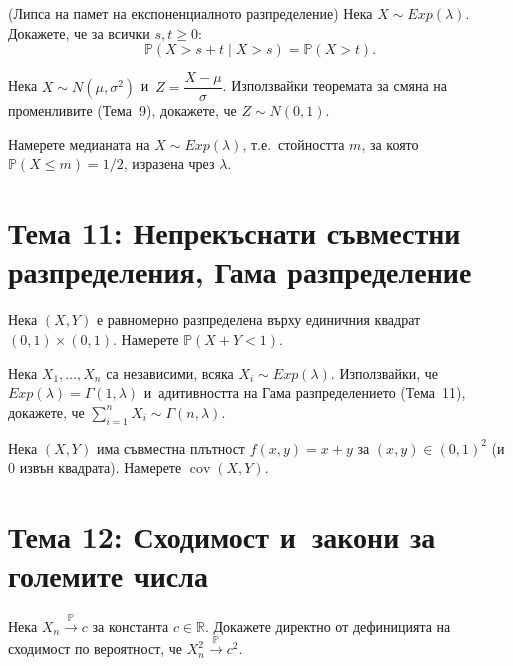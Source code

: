 \begin{probbox}[Задача 10.1]
(Липса на памет на експоненциалното разпределение) Нека $X\sim
Exp(\lambda)$. Докажете, че за всички $s,t\ge0$:
\[
  \mathbb P(X>s+t\mid X>s) = \mathbb P(X>t).
\]
\end{probbox}

\begin{probbox}[Задача 10.2]
Нека $X\sim N(\mu,\sigma^2)$ и~$Z=\dfrac{X-\mu}\sigma$. Използвайки
теоремата за смяна на променливите (Тема~9), докажете, че $Z\sim
N(0,1)$.
\end{probbox}

\begin{probbox}[Задача 10.3]
Намерете медианата на $X\sim Exp(\lambda)$, т.е.\ стойността $m$,
за която $\mathbb P(X\le m)=1/2$, изразена чрез $\lambda$.
\end{probbox}

\section*{Тема 11: Непрекъснати съвместни разпределения, Гама разпределение}

\begin{probbox}[Задача 11.1]
Нека $(X,Y)$ е равномерно разпределена върху единичния квадрат
$(0,1)\times(0,1)$. Намерете $\mathbb P(X+Y<1)$.
\end{probbox}

\begin{probbox}[Задача 11.2]
Нека $X_1,\dots,X_n$ са независими, всяка $X_i\sim Exp(\lambda)$.
Използвайки, че $Exp(\lambda)=\Gamma(1,\lambda)$ и~адитивността на
Гама разпределението (Тема~11), докажете, че $\sum_{i=1}^n X_i \sim
\Gamma(n,\lambda)$.
\end{probbox}

\begin{probbox}[Задача 11.3]
Нека $(X,Y)$ има съвместна плътност $f(x,y)=x+y$ за $(x,y)\in(0,1)^2$
(и~$0$ извън квадрата). Намерете $\operatorname{cov}(X,Y)$.
\end{probbox}

\section*{Тема 12: Сходимост и~закони за големите числа}

\begin{probbox}[Задача 12.1]
Нека $X_n\xrightarrow{\mathbb P}c$ за константа $c\in\mathbb R$.
Докажете директно от дефиницията на сходимост по вероятност, че
$X_n^2\xrightarrow{\mathbb P}c^2$.
\end{probbox}

